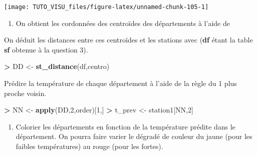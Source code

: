 \documentclass[]{book}
\newenvironment{Shaded}{\begin{snugshade}}{\end{snugshade}}
\newcommand{\DataTypeTok}[1]{\textcolor[rgb]{0.13,0.29,0.53}{#1}}
\newcommand{\DecValTok}[1]{\textcolor[rgb]{0.00,0.00,0.81}{#1}}
\newcommand{\KeywordTok}[1]{\textcolor[rgb]{0.13,0.29,0.53}{\textbf{#1}}}
\newcommand{\NormalTok}[1]{#1}
\newcommand{\OperatorTok}[1]{\textcolor[rgb]{0.81,0.36,0.00}{\textbf{#1}}}
\newcommand{\StringTok}[1]{\textcolor[rgb]{0.31,0.60,0.02}{#1}}
\providecommand{\tightlist}{%
  \setlength{\itemsep}{0pt}\setlength{\parskip}{0pt}}
\theoremstyle{definition}
\theoremstyle{definition}
\theoremstyle{definition}
\theoremstyle{remark}
\begin{document}
\begin{center}\texttt{[image: TUTO\_VISU\_files/figure-latex/unnamed-chunk-105-1]} \end{center}

\begin{enumerate}
\def\labelenumi{\arabic{enumi}.}
\setcounter{enumi}{4}
\tightlist
\item
  On obtient les cordonnées des centroïdes des départements à l'aide de
\end{enumerate}

\begin{Shaded}
\end{Shaded}

On déduit les distances entre ces centroïdes et les stations avec (\textbf{df} étant la table \textbf{sf} obtenue à la question 3).

\begin{Shaded}
\begin{Highlighting}[]
\OperatorTok{>}\StringTok{ }\NormalTok{DD <-}\StringTok{ }\KeywordTok{st_distance}\NormalTok{(df,centro)}
\end{Highlighting}
\end{Shaded}

Prédire la température de chaque département à l'aide de la règle du 1 plus proche voisin.

\begin{Shaded}
\begin{Highlighting}[]
\OperatorTok{>}\StringTok{ }\NormalTok{NN <-}\StringTok{ }\KeywordTok{apply}\NormalTok{(DD,}\DecValTok{2}\NormalTok{,order)[}\DecValTok{1}\NormalTok{,]}
\OperatorTok{>}\StringTok{ }\NormalTok{t_prev <-}\StringTok{ }\NormalTok{station1[NN,}\DecValTok{2}\NormalTok{]}
\end{Highlighting}
\end{Shaded}

\begin{enumerate}
\def\labelenumi{\arabic{enumi}.}
\setcounter{enumi}{5}
\tightlist
\item
  Colorier les départements en fonction de la température prédite dans le département. On pourra faire varier le dégradé de couleur du jaune (pour les faibles températures) au rouge (pour les fortes).
\end{enumerate}
\end{document}
